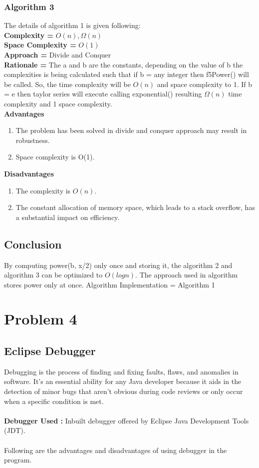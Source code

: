 \documentclass[a4paper,12pt]{article}
\begin{document}
        \subsubsection{Algorithm 3}
    The details of algorithm 1 is given following:
    \\\textbf{ Complexity = } $O(n), \Omega(n)$
    \\\textbf{Space Complexity = } $O(1)$
    \\\textbf{Approach = } Divide and Conquer
    \\\textbf{Rationale = } The a and b are the constants, depending on the value of b the complexities is being calculated such that if b = any integer then f5Power() will be called. So, the time complexity will be $O(n)$ and space complexity to 1. If b = e then taylor series will execute calling exponential() resulting $\Omega(n)$ time complexity and 1 space complexity.
    \\\textbf{Advantages}
    \begin{enumerate}
        \item The problem has been solved in divide and conquer approach may result in robustness.
        \item Space complexity is O(1).
    \end{enumerate}
    \textbf{Disadvantages}
    \begin{enumerate}
        \item The complexity is $O(n)$.
        \item The constant allocation of memory space, which leads to a stack overflow, has a substantial impact on efficiency. 
    \end{enumerate}
    
    \subsection{Conclusion}
    By computing power(b, x/2) only once and storing it, the algorithm 2 and algorithm 3 can be optimized to $O(logn)$. The approach used in algorithm stores power only at once.
    Algorithm Implementation = Algorithm 1

\section{Problem 4}
    \subsection{Eclipse Debugger}
    Debugging is the process of finding and fixing faults, flaws, and anomalies in software. It's an essential ability for any Java developer because it aids in the detection of minor bugs that aren't obvious during code reviews or only occur when a specific condition is met.
    \\ \\ \textbf{Debugger Used :} Inbuilt debugger offered by Eclipse Java Development Tools (JDT). 
    \\ \\Following are the advantages and disadvantages of using debugger in the program.
\end{document}
